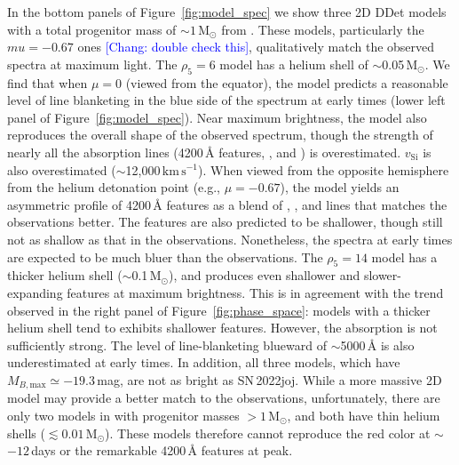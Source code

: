 \documentclass[twocolumn]{aastex631}
\newcommand{\sn}{SN\,2022joj}
\newcommand{\kms}{$\mathrm{km}\,\mathrm{s}^{-1}$}
\newcommand{\chang}[1]{\textcolor{blue}{[Chang: #1]}}
\begin{document}
\begin{CJK*}{UTF8}{gbsn}

In the bottom panels of Figure~\ref{fig:model_spec} we show three 2D DDet models with a total progenitor mass of $\sim$$1\,\mathrm{M_\odot}$ from \citet{Shen_2D_2021}. These models, particularly the $mu = -0.67$ ones \chang{double check this}, qualitatively match the observed spectra at maximum light. The $\rho_5=6$ model has a helium shell of $\sim$0.05$\,\mathrm{M_\odot}$. We find that when $\mu=0$ (viewed from the equator), the model predicts a reasonable level of line blanketing in the blue side of the spectrum at early times (lower left panel of Figure~\ref{fig:model_spec}). Near maximum brightness, the model also reproduces the overall shape of the observed spectrum, though the strength of nearly all the absorption lines (4200\,\r{A} features, , and ) is overestimated. $v_\mathrm{Si}$ is also overestimated ($\sim$12,000\,\kms). When viewed from the opposite hemisphere from the helium detonation point (e.g., $\mu=-0.67$), the model yields an asymmetric profile of 4200\,\r{A} features as a blend of , , and  lines that matches the observations better. The  features are also predicted to be shallower, though still not as shallow as that in the observations. Nonetheless, the spectra at early times are expected to be much bluer than the observations. The $\rho_5=14$ model has a thicker helium shell ($\sim$0.1\,$\mathrm{M_\odot}$), and produces even shallower and slower-expanding  features at maximum brightness. This is in agreement with the trend observed in the right panel of Figure~\ref{fig:phase_space}: models with a thicker helium shell tend to exhibits shallower  features. However, the  absorption is not sufficiently strong. The level of line-blanketing blueward of $\sim$5000\,\r{A} is also underestimated at early times. In addition, all three models, which have $M_{B,\mathrm{max}}\simeq -19.3$\,mag, are not as bright as \sn. While a more massive 2D model may provide a better match to the observations, unfortunately, there are only two models in \citet{Shen_2D_2021} with progenitor masses $>1\,\mathrm{M_\odot}$, and both have thin helium shells ($\lesssim$$0.01\,\mathrm{M_\odot}$). These models therefore cannot reproduce the red color at $\sim$$-12$\,days or the remarkable 4200\,\r{A} features at peak.


\end{CJK*}
\end{document}
